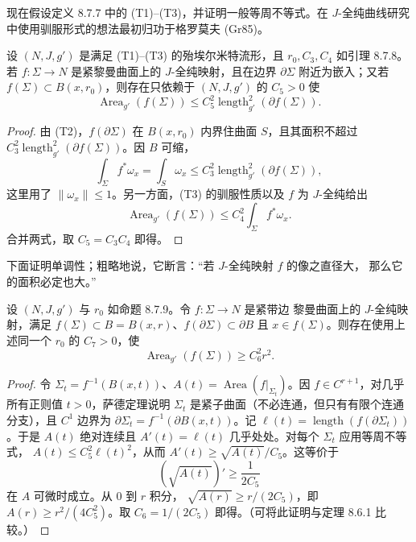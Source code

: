 现在假设定义 8.7.7 中的 (T1)--(T3)，并证明一般等周不等式。在
$J$-全纯曲线研究中使用驯服形式的想法最初归功于格罗莫夫 (Gr85)。
\begin{proposition}[等周不等式]\label{prop:ch8-j-holomorphic-isoperimetric}
设 $(N,J,g')$ 是满足 (T1)--(T3) 的殆埃尔米特流形，且
$r_0,C_3,C_4$ 如引理 8.7.8。若 $f:\Sigma\to N$ 是紧黎曼曲面上的
$J$-全纯映射，且在边界 $\partial\Sigma$ 附近为嵌入；又若
$f(\Sigma)\subset B(x,r_0)$，则存在只依赖于 $(N,J,g')$ 的 $C_5>0$ 使
\begin{equation}\operatorname{Area}_{g'}(f(\Sigma))\leq C_5^2\operatorname{length}_{g'}^2(\partial f(\Sigma)).\label{eq:ch8-j-holomorphic-isoperimetric}\end{equation}
\end{proposition}
\begin{proof}
由 (T2)，$f(\partial\Sigma)$ 在 $B(x,r_0)$ 内界住曲面 $S$，且其面积不超过
$C_3^2\operatorname{length}_{g'}^2(\partial f(\Sigma))$。因 $B$ 可缩，
\[
 \int_\Sigma f^*\omega_x=\int_S\omega_x
 \leq C_3^2\operatorname{length}_{g'}^2(\partial f(\Sigma)),
\]
这里用了 $\|\omega_x\|\leq1$。另一方面，(T3) 的驯服性质以及 $f$ 为
$J$-全纯给出
\[
 \operatorname{Area}_{g'}(f(\Sigma))
 \leq C_4^2\int_\Sigma f^*\omega_x.
\]
合并两式，取 $C_5=C_3C_4$ 即得。
\end{proof}
下面证明单调性；粗略地说，它断言：“若 $J$-全纯映射 $f$ 的像之直径大，
那么它的面积必定也大。”
\begin{proposition}[单调性]\label{prop:ch8-monotonicity}
设 $(N,J,g')$ 与 $r_0$ 如命题 8.7.9。令 $f:\Sigma\to N$ 是紧带边
黎曼曲面上的 $J$-全纯映射，满足
$f(\Sigma)\subset B=B(x,r)$、$f(\partial\Sigma)\subset\partial B$ 且
$x\in f(\Sigma)$。则存在使用上述同一个 $r_0$ 的 $C_7>0$，使
\begin{equation}\operatorname{Area}_{g'}(f(\Sigma))\geq C_6^2r^2.\label{eq:ch8-monotonicity}\end{equation}
\end{proposition}
\begin{proof}
令 $\Sigma_t=f^{-1}(B(x,t))$、$A(t)=\operatorname{Area}(f|_{\Sigma_t})$。因
$f\in C^{r+1}$，对几乎所有正则值 $t>0$，萨德定理说明 $\Sigma_t$ 是紧子曲面（不必连通，但只有有限个连通分支），且 $C^1$ 边界为
$\partial\Sigma_t=f^{-1}(\partial B(x,t))$。记
$\ell(t)=\operatorname{length}(f(\partial\Sigma_t))$。于是 $A(t)$ 绝对连续且
$A'(t)=\ell(t)$ 几乎处处。对每个 $\Sigma_t$ 应用等周不等式，
$A(t)\leq C_5^2\ell(t)^2$，从而 $A'(t)\geq\sqrt{A(t)}/C_5$。这等价于
\[
 (\sqrt{A(t)})'\geq\frac1{2C_5}
\]
在 $A$ 可微时成立。从 $0$ 到 $r$ 积分，
$\sqrt{A(r)}\geq r/(2C_5)$，即
$A(r)\geq r^2/(4C_5^2)$。取 $C_6=1/(2C_5)$ 即得。（可将此证明与定理 8.6.1 比较。）
\end{proof}
